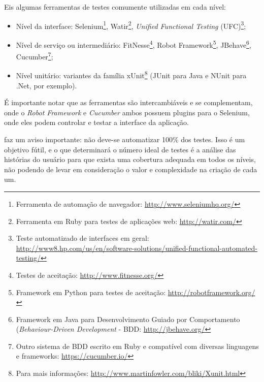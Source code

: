 \documentclass[
	12pt,				%
	openright,			%
	oneside,			%
	a4paper,			%
	english,			%
	brazil,				%
	]{abntex2}
\begin{document}
Eis algumas ferramentas de testes comumente utilizadas em cada nível:
\begin{itemize}
    \item Nível da interface: Selenium\footnote{Ferramenta de automação de navegador: \url{http://www.seleniumhq.org/}}, Watir\footnote{Ferramenta em Ruby para testes de aplicações web: \url{http://watir.com/}}, \emph{Unified Functional Testing} (UFC)\footnote{Teste automatizado de interfaces em geral: \url{http://www8.hp.com/us/en/software-solutions/unified-functional-automated-testing/}};
    \item Nível de serviço ou intermediário: FitNesse\footnote{Testes de aceitação: \url{http://www.fitnesse.org/}}, Robot Framework\footnote{Framework em Python para testes de aceitação: \url{http://robotframework.org/}}, JBehave\footnote{Framework em Java para Desenvolvimento Guiado por Comportamento (\emph{Behaviour-Driven Development} - BDD: \url{http://jbehave.org/}}, Cucumber\footnote{Outro sistema de BDD escrito em Ruby e compatível com diversas linguagens e frameworks: \url{https://cucumber.io/}};
    \item Nível unitário: variantes da família xUnit\footnote{Para mais informações: \url{http://www.martinfowler.com/bliki/Xunit.html}} (JUnit para Java e NUnit para .Net, por exemplo).
\end{itemize}

É importante notar que as ferramentas são intercambiáveis e se complementam, onde o \emph{Robot Framework} e \emph{Cucumber} ambos possuem plugins para o Selenium, onde eles podem controlar e testar a interface da aplicação.

 faz um aviso importante: não deve-se automatizar 100\% dos testes. Isso é um objetivo fútil, e o que determinará o número ideal de testes é a análise das histórias do usuário para que exista uma cobertura adequada em todos os níveis, não podendo de levar em consideração o valor e complexidade na criação de cada um.


\end{document}
